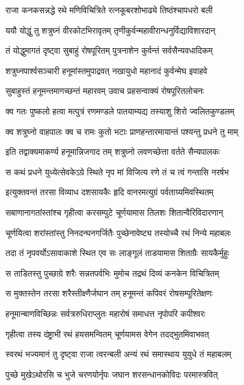 \twolineshloka
{राजा कनकसन्नद्धे रथे मणिविचित्रिते}
{रत्नकूबरशोभाढ्ये तिष्ठंश्चापधरो बली}%

\twolineshloka
{ययौ योद्धुं तु शत्रुघ्नं वीरकोटभिरावृतम्}
{तृणीकुर्वन्महावीरान्धनुर्विद्याविशारदान्}%

\twolineshloka
{तं योद्धुमागतं दृष्ट्वा सुबाहुं रोषपूरितम्}
{पुत्रनाशेन कुर्वन्तं सर्वसैन्यवधादिकम्}%

\twolineshloka
{शत्रुघ्नपार्श्वसञ्चारी हनूमांस्तमुपाद्रवत्}
{नखायुधो महानादं कुर्वन्मेघ इवाहवे}%

\twolineshloka
{सुबाहुस्तं हनूमन्तमागच्छन्तं महारवम्}
{उवाच प्रहसन्वाक्यं रोषपूरितलोचनः}%

\twolineshloka
{क्व गतः पुष्कलो हत्वा मत्पुत्रं रणमण्डले}
{पातयाम्यद्य तस्याशु शिरो ज्वलितकुण्डलम्}%

\twolineshloka
{क्व शत्रुघ्नो वाहपालः क्व च रामः कुतो भटाः}
{प्राणहन्तारमायान्तं पश्यन्तु प्रधने तु माम्}%

\twolineshloka
{इति तद्वाक्यमाकर्ण्य हनूमान्निजगाद तम्}
{शत्रुघ्नो लवणच्छेत्ता वर्तते सैन्यपालकः}%

\twolineshloka
{स कथं प्रधने युध्येत्सेवकेऽग्रे स्थिते नृप}
{मां विजित्य रणे तं च त्वं गन्तासि नरर्षभ}%

\twolineshloka
{इत्युक्तवन्तं तरसा विव्याध दशसायकैः}
{हृदि वानरमत्युग्रं पर्वताग्र्यमिवस्थितम्}%

\twolineshloka
{सबाणानागतांस्तांश्च गृहीत्वा करसम्पुटे}
{चूर्णयामास तिलशः शितान्वैरिविदारणान्}%

\twolineshloka
{चूर्णयित्वा शरांस्तांस्तु निनदन्घनगर्जितैः}
{पुच्छेनावेष्ट्य तस्योच्चै रथं निन्ये महाबलः}%

\twolineshloka
{तदा तं नृपवर्योऽसावाकाशे स्थित एव सः}
{लाङ्गूलं ताडयामास शिताग्रैः सायकैर्मुहुः}%

\twolineshloka
{स ताडितस्तु पुच्छाग्रे शरैः सन्नतपर्वभिः}
{मुमोच तद्रथं दिव्यं कनकेन विचित्रितम्}%

\twolineshloka
{स मुक्तस्तेन तरसा शरैस्तीक्ष्णैर्जघान तम्}
{हनूमन्तं कपिवरं रोषसम्पूरितेक्षणः}%

\twolineshloka
{हनूमान्बाणविच्छिन्नः सर्वत्ररुधिराप्लुतः}
{महारोषं समाधत्त नृपोपरि कपीश्वरः}%

\twolineshloka
{गृहीत्वा तस्य दंष्ट्राभी रथं हयसमन्वितम्}
{चूर्णयामस वेगेन तदद्भुतमिवाभवत्}%

\twolineshloka
{स्वरथं भज्यमानं तु दृष्ट्वा राजा त्वरन्बली}
{अन्यं रथं समास्थाय युयुधे तं महाबलम्}%

\twolineshloka
{पुच्छे मुखेऽथोरसि च भुजे चरणयोर्नृपः}
{जघान शरसन्धानकोविदः परमास्त्रवित्}%

